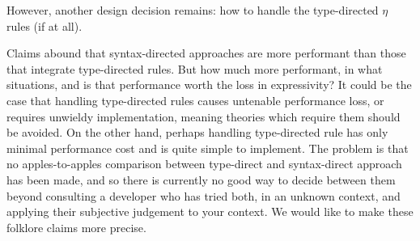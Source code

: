 

However, another design decision remains: how to handle the type-directed $\eta$ rules (if at all).

Claims abound that syntax-directed approaches are more performant than those that integrate type-directed rules.
But how much more performant, in what situations, and is that performance worth the loss in expressivity?
It could be the case that handling type-directed rules causes untenable performance loss, or requires unwieldy implementation, meaning theories which require them should be avoided.
On the other hand, perhaps handling type-directed rule has only minimal performance cost and is quite simple to implement.
The problem is that no apples-to-apples comparison between type-direct and syntax-direct approach has been made, and so there is currently no good way to decide between them beyond consulting a developer who has tried both, in an unknown context, and applying their subjective judgement to your context.
We would like to make these folklore claims more precise.

%

